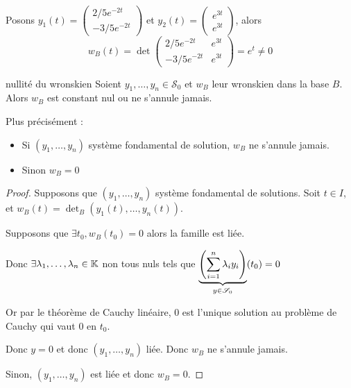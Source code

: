 \begin{exemple}
    Posons $y_1(t) = \begin{pmatrix}
        2/5 e^{-2t} \\ -3/5 e^{-2t}
    \end{pmatrix}$ et $y_2(t) = \begin{pmatrix}
        e^{3t} \\ e^{3t}
    \end{pmatrix}$, alors 
    $$w_B(t) = \det \begin{pmatrix}
        2/5 e^{-2t} & e^{3t} \\
        -3/5 e^{-2t} & e^{3t}
    \end{pmatrix} = e^{t} \neq 0$$
\end{exemple}

\begin{theoreme}{nullité du wronskien}{}
    Soient $y_1, \dots, y_n \in \mathscr S_0$ et $w_B$ leur wronskien dans la base $B$. Alors 
    $w_B$ est constant nul ou ne s'annule jamais. 

    Plus précisément : 
    \begin{itemize}
        \item Si $(y_1, \dots, y_n)$ système fondamental de solution, $w_B$ ne s'annule jamais. 
        \item Sinon $w_B = 0$
    \end{itemize}
\end{theoreme}


\begin{proof}
    Supposons que $(y_1, \dots, y_n)$ système fondamental de solutions. Soit $t \in I$, 
    et $w_B(t) = \det_B (y_1(t), \dots, y_n(t))$.

    Supposons que $\exists t_0, w_B(t_0) = 0$ alors la famille est liée. 

    Donc $\exists \lambda_1, \dots, \lambda_n \in \mathbb{K}$ non tous nuls tels que
    $\displaystyle\underbrace{ \left( \sum_{i = 1}^{n} \lambda_i y_i \right)}_{y \in \mathscr S_0} (t_0) = 0$

    Or par le théorème de Cauchy linéaire, $0$ est l'unique solution au problème de Cauchy
    qui vaut $0$ en $t_0$. 

    Donc $y = 0$ et donc $(y_1, \dots, y_n)$ liée. Donc $w_B$ ne s'annule jamais.

    Sinon, $(y_1, \dots, y_n)$ est liée et donc $w_B = 0$.
\end{proof}


